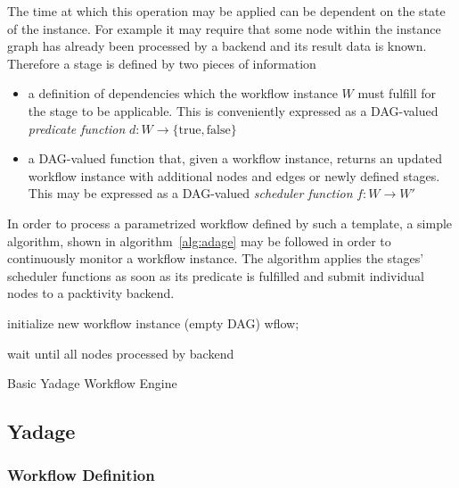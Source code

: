 \documentclass[a4paper]{jpconf}
\begin{document}
The time at which this operation may be applied can be dependent on the state of the instance. For example it may require that some node within the instance graph has already been processed by a backend and its result data is known. Therefore a stage is defined by two pieces of information

\begin{itemize}
	\item a definition of dependencies which the workflow instance $W$ must fulfill for the stage to be applicable. This is conveniently expressed as a DAG-valued \emph{predicate function} $d: W\to \{\mathrm{true},\mathrm{false}\}$
	\item a DAG-valued function that, given a workflow instance, returns an updated workflow instance with additional nodes and edges or newly defined stages. This may be expressed as a DAG-valued \emph{scheduler function} $f: W\to W'$
\end{itemize}

In order to process a parametrized workflow defined by such a template, a simple algorithm, shown in algorithm~\ref{alg:adage} may be followed in order to continuously monitor a workflow instance. The algorithm applies the stages' scheduler functions as soon as its predicate is fulfilled and submit individual nodes to a packtivity backend.
\\

\begin{algorithm}[H]
\footnotesize
 initialize new workflow instance (empty DAG) wflow;

 wait until all nodes processed by backend
 \caption{Basic Yadage Workflow Engine}
 \label{alg:adage}
\end{algorithm}

\subsection{Yadage}

\subsubsection{Workflow Definition}
\end{document}
